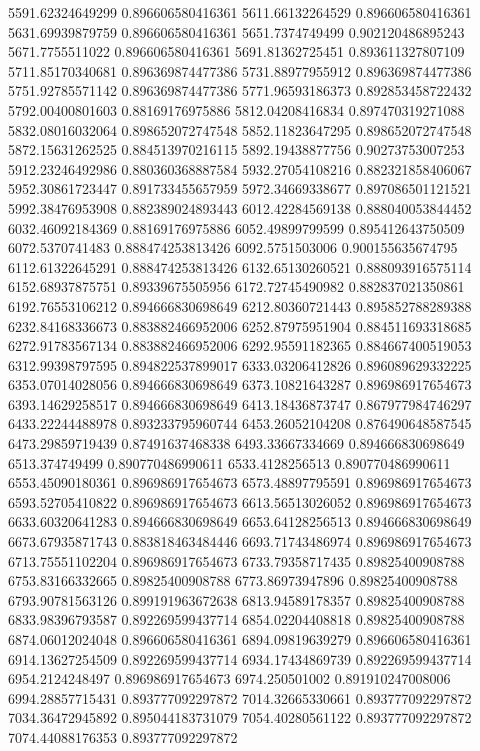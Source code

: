 {5591.62324649299 0.896606580416361
5611.66132264529 0.896606580416361
5631.69939879759 0.896606580416361
5651.7374749499 0.902120486895243
5671.7755511022 0.896606580416361
5691.81362725451 0.893611327807109
5711.85170340681 0.896369874477386
5731.88977955912 0.896369874477386
5751.92785571142 0.896369874477386
5771.96593186373 0.892853458722432
5792.00400801603 0.88169176975886
5812.04208416834 0.897470319271088
5832.08016032064 0.898652072747548
5852.11823647295 0.898652072747548
5872.15631262525 0.884513970216115
5892.19438877756 0.90273753007253
5912.23246492986 0.880360368887584
5932.27054108216 0.882321858406067
5952.30861723447 0.891733455657959
5972.34669338677 0.897086501121521
5992.38476953908 0.882389024893443
6012.42284569138 0.888040053844452
6032.46092184369 0.88169176975886
6052.49899799599 0.895412643750509
6072.5370741483 0.888474253813426
6092.5751503006 0.900155635674795
6112.61322645291 0.888474253813426
6132.65130260521 0.888093916575114
6152.68937875751 0.89339675505956
6172.72745490982 0.882837021350861
6192.76553106212 0.894666830698649
6212.80360721443 0.895852788289388
6232.84168336673 0.883882466952006
6252.87975951904 0.884511693318685
6272.91783567134 0.883882466952006
6292.95591182365 0.884667400519053
6312.99398797595 0.894822537899017
6333.03206412826 0.896089629332225
6353.07014028056 0.894666830698649
6373.10821643287 0.896986917654673
6393.14629258517 0.894666830698649
6413.18436873747 0.867977984746297
6433.22244488978 0.893233795960744
6453.26052104208 0.876490648587545
6473.29859719439 0.87491637468338
6493.33667334669 0.894666830698649
6513.374749499 0.890770486990611
6533.4128256513 0.890770486990611
6553.45090180361 0.896986917654673
6573.48897795591 0.896986917654673
6593.52705410822 0.896986917654673
6613.56513026052 0.896986917654673
6633.60320641283 0.894666830698649
6653.64128256513 0.894666830698649
6673.67935871743 0.883818463484446
6693.71743486974 0.896986917654673
6713.75551102204 0.896986917654673
6733.79358717435 0.89825400908788
6753.83166332665 0.89825400908788
6773.86973947896 0.89825400908788
6793.90781563126 0.899191963672638
6813.94589178357 0.89825400908788
6833.98396793587 0.892269599437714
6854.02204408818 0.89825400908788
6874.06012024048 0.896606580416361
6894.09819639279 0.896606580416361
6914.13627254509 0.892269599437714
6934.17434869739 0.892269599437714
6954.2124248497 0.896986917654673
6974.250501002 0.891910247008006
6994.28857715431 0.893777092297872
7014.32665330661 0.893777092297872
7034.36472945892 0.895044183731079
7054.40280561122 0.893777092297872
7074.44088176353 0.893777092297872
}
